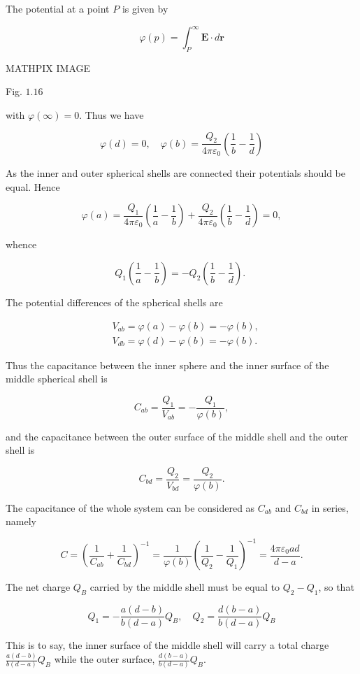 \documentclass[10pt]{article}
\begin{document}
The potential at a point $P$ is given by

$$
\varphi(p)=\int_{P}^{\infty} \mathbf{E} \cdot d \mathbf{r}
$$

MATHPIX IMAGE

Fig. $1.16$

with $\varphi(\infty)=0$. Thus we have

$$
\varphi(d)=0, \quad \varphi(b)=\frac{Q_{2}}{4 \pi \varepsilon_{0}}\left(\frac{1}{b}-\frac{1}{d}\right)
$$

As the inner and outer spherical shells are connected their potentials should be equal. Hence

$$
\varphi(a)=\frac{Q_{1}}{4 \pi \varepsilon_{0}}\left(\frac{1}{a}-\frac{1}{b}\right)+\frac{Q_{2}}{4 \pi \varepsilon_{0}}\left(\frac{1}{b}-\frac{1}{d}\right)=0,
$$

whence

$$
Q_{1}\left(\frac{1}{a}-\frac{1}{b}\right)=-Q_{2}\left(\frac{1}{b}-\frac{1}{d}\right) \text {. }
$$

The potential differences of the spherical shells are

$$
\begin{aligned}
&V_{a b}=\varphi(a)-\varphi(b)=-\varphi(b), \\
&V_{d b}=\varphi(d)-\varphi(b)=-\varphi(b) .
\end{aligned}
$$

Thus the capacitance between the inner sphere and the inner surface of the middle spherical shell is

$$
C_{a b}=\frac{Q_{1}}{V_{a b}}=-\frac{Q_{1}}{\varphi(b)},
$$

and the capacitance between the outer surface of the middle shell and the outer shell is

$$
C_{b d}=\frac{Q_{2}}{V_{b d}}=\frac{Q_{2}}{\varphi(b)} .
$$

The capacitance of the whole system can be considered as $C_{a b}$ and $C_{b d}$ in series, namely

$$
C=\left(\frac{1}{C_{a b}}+\frac{1}{C_{b d}}\right)^{-1}=\frac{1}{\varphi(b)}\left(\frac{1}{Q_{2}}-\frac{1}{Q_{1}}\right)^{-1}=\frac{4 \pi \varepsilon_{0} a d}{d-a} .
$$

 The net charge $Q_{B}$ carried by the middle shell must be equal to $Q_{2}-Q_{1}$, so that

$$
Q_{1}=-\frac{a(d-b)}{b(d-a)} Q_{B}, \quad Q_{2}=\frac{d(b-a)}{b(d-a)} Q_{B}
$$

This is to say, the inner surface of the middle shell will carry a total charge $\frac{a(d-b)}{b(d-a)} Q_{B}$ while the outer surface, $\frac{d(b-a)}{b(d-a)} Q_{B}$.
\end{document}
